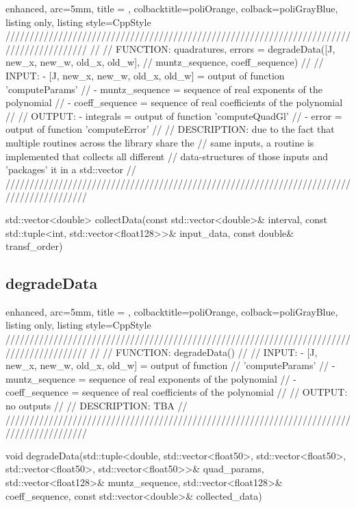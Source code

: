 \documentclass[a4paper, twosided]{book}
\begin{document}
\begin{tcblisting}{enhanced,
                   arc=5mm,
                   title = \color{black}{\large \ttfamily DatIo.cpp/collectData},
                   colbacktitle=poliOrange,
                   colback=poliGrayBlue,
                   listing only,
                   listing style=CppStyle}
/////////////////////////////////////////////////////////////////////////////////////////
//
//       FUNCTION: {quadratures, errors} = degradeData([J, {new_x, new_w, old_x, old_w}],
//                                                      muntz_sequence, coeff_sequence)
//                
//        INPUT: - [J, {new_x, new_w, old_x, old_w}] = output of function 'computeParams'
//               - muntz_sequence = sequence of real exponents of the polynomial
//               - coeff_sequence = sequence of real coefficients of the polynomial
//
//       OUTPUT: - integrals = output of function 'computeQuadGl' 
//               - error = output of function 'computeError'
//
//    DESCRIPTION: due to the fact that multiple routines across the library share the 
//                 same inputs, a routine is implemented that collects all different
//                 data-structures of those inputs and 'packages' it in a std::vector
//
/////////////////////////////////////////////////////////////////////////////////////////

std::vector<double> collectData(const std::vector<double>& interval, const std::tuple<int, std::vector<float128>>& input_data, const double& transf_order)
\end{tcblisting}

\newpage
\subsection[degradeData]{\changefont degradeData}\label{SubSec4.2.5}

\begin{tcblisting}{enhanced,
                   arc=5mm,
                   title = \color{black}{\large \ttfamily DatIo.cpp/degradeData},
                   colbacktitle=poliOrange,
                   colback=poliGrayBlue,
                   listing only,
                   listing style=CppStyle}
/////////////////////////////////////////////////////////////////////////////////////////
//
//       FUNCTION: degradeData()
//                
//          INPUT: - [J, {new_x, new_w, old_x, old_w}] = output of function
//                                                       'computeParams'
//                 - muntz_sequence = sequence of real exponents of the polynomial
//                 - coeff_sequence = sequence of real coefficients of the polynomial
//
//         OUTPUT: no outputs
//
//    DESCRIPTION: TBA
//
/////////////////////////////////////////////////////////////////////////////////////////


void degradeData(std::tuple<double, std::vector<float50>, std::vector<float50>, std::vector<float50>, std::vector<float50>>& quad_params, std::vector<float128>& muntz_sequence, std::vector<float128>& coeff_sequence, const std::vector<double>& collected_data)
\end{tcblisting}
\end{document}
